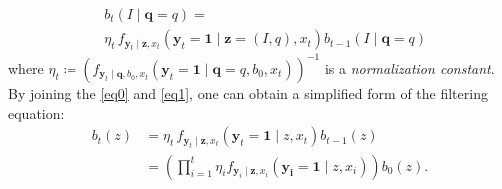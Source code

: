 \documentclass[letterpaper, 10 pt, conference]{ieeeconf}
\newcommand{\Ram}[1]{{\normalsize{\textbf{({\color{green}Ram:\ }#1)}}}}
\begin{document}
\begin{align}
&b_{t}(I \mid \bm{q} = q)= \nonumber \\
&\eta_t\,
f_{\bm{y}_{t} \mid
	\bm{z},{x}_{t}}\left(
\bm{y}_{t} = \bm{1} \mid
\bm{z}=(I,q),{x}_{t}\right)
b_{t-1}(I \mid \bm{q} = q)
\label{eq1}
\end{align}
where 
$
\eta_{t} \coloneqq \left(
f_{\bm{y}_{t} \mid
	\bm{q},
	b_0,
	{x}_{t}	
}\left(
\bm{y}_{t}=\bm{1} \mid
\bm{q}=q,b_0,
{x}_{t}
\right)
\right)^{-1}
$ is a \emph{normalization constant}. 
%
By joining the \eqref{eq0} and \eqref{eq1}, one can obtain a simplified form of the filtering equation:
\begin{align*}
b_t(z) &=
\eta_t\,
f_{\bm{y}_{t} \mid
	\bm{z},{x}_{t}}\left(
\bm{y}_{t} = \bm{1} \mid
z,{x}_{t}\right)
b_{t-1}(z) \nonumber\\
&=\left(\prod_{i=1}^t
\eta_i
f_{\bm{y}_{i} \mid
	\bm{z},{x}_{i}}\left(
\bm{y_{i}}=\bm{1} \mid
z,{x}_{i}\right) \right)
b_0(z).
\end{align*}
\end{document}

